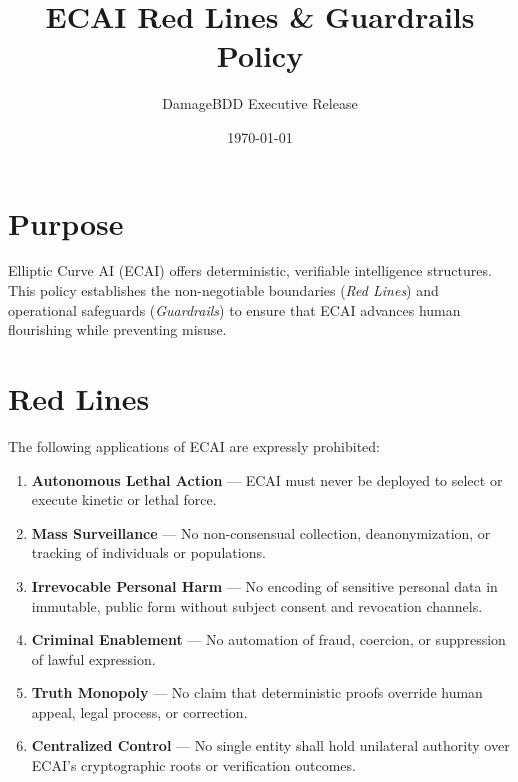 \documentclass[12pt,a4paper]{article}
\title{\textbf{ECAI Red Lines \& Guardrails Policy}}
\author{DamageBDD Executive Release}
\date{\today}
\begin{document}
\maketitle

\section*{Purpose}
Elliptic Curve AI (ECAI) offers deterministic, verifiable intelligence structures. 
This policy establishes the non-negotiable boundaries (\emph{Red Lines}) and operational safeguards (\emph{Guardrails}) 
to ensure that ECAI advances human flourishing while preventing misuse.

\section*{Red Lines}
The following applications of ECAI are expressly prohibited:
\begin{enumerate}[label=\textbf{\arabic*.}]
  \item \textbf{Autonomous Lethal Action} — ECAI must never be deployed to select or execute kinetic or lethal force.
  \item \textbf{Mass Surveillance} — No non-consensual collection, deanonymization, or tracking of individuals or populations.
  \item \textbf{Irrevocable Personal Harm} — No encoding of sensitive personal data in immutable, public form without subject consent and revocation channels.
  \item \textbf{Criminal Enablement} — No automation of fraud, coercion, or suppression of lawful expression.
  \item \textbf{Truth Monopoly} — No claim that deterministic proofs override human appeal, legal process, or correction.
  \item \textbf{Centralized Control} — No single entity shall hold unilateral authority over ECAI’s cryptographic roots or verification outcomes.
\end{enumerate}
\end{document}
